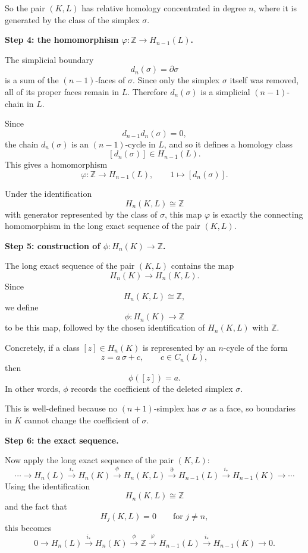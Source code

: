 \begin{solution}
So the pair \((K,L)\) has relative homology concentrated in degree \(n\), where it is generated by the class of the simplex \(\sigma\).

\par

\textbf{Step 4: the homomorphism \(\varphi:\mathbb Z\to H_{n-1}(L)\).}

The simplicial boundary
\[
d_n(\sigma)=\partial \sigma
\]
is a sum of the \((n-1)\)-faces of \(\sigma\). Since only the simplex \(\sigma\) itself was removed, all of its proper faces remain in \(L\). Therefore \(d_n(\sigma)\) is a simplicial \((n-1)\)-chain in \(L\).

Since
\[
d_{n-1}d_n(\sigma)=0,
\]
the chain \(d_n(\sigma)\) is an \((n-1)\)-cycle in \(L\), and so it defines a homology class
\[
[d_n(\sigma)]\in H_{n-1}(L).
\]
This gives a homomorphism
\[
\varphi:\mathbb Z\to H_{n-1}(L),
\qquad
1\mapsto [d_n(\sigma)].
\]

Under the identification
\[
H_n(K,L)\cong \mathbb Z
\]
with generator represented by the class of \(\sigma\), this map \(\varphi\) is exactly the connecting homomorphism in the long exact sequence of the pair \((K,L)\).

\par

\textbf{Step 5: construction of \(\phi:H_n(K)\to \mathbb Z\).}

The long exact sequence of the pair \((K,L)\) contains the map
\[
H_n(K)\to H_n(K,L).
\]
Since
\[
H_n(K,L)\cong \mathbb Z,
\]
we define
\[
\phi:H_n(K)\to \mathbb Z
\]
to be this map, followed by the chosen identification of \(H_n(K,L)\) with \(\mathbb Z\).

Concretely, if a class \([z]\in H_n(K)\) is represented by an \(n\)-cycle of the form
\[
z = a\,\sigma + c,
\qquad c\in C_n(L),
\]
then
\[
\phi([z])=a.
\]
In other words, \(\phi\) records the coefficient of the deleted simplex \(\sigma\).

This is well-defined because no \((n+1)\)-simplex has \(\sigma\) as a face, so boundaries in \(K\) cannot change the coefficient of \(\sigma\).

\par

\textbf{Step 6: the exact sequence.}

Now apply the long exact sequence of the pair \((K,L)\):
\[
\cdots \to H_n(L)\xrightarrow{i_*} H_n(K)\xrightarrow{\phi} H_n(K,L)
\xrightarrow{\partial} H_{n-1}(L)\xrightarrow{i_*} H_{n-1}(K)\to \cdots
\]
Using the identification
\[
H_n(K,L)\cong \mathbb Z
\]
and the fact that
\[
H_j(K,L)=0\qquad\text{for } j\neq n,
\]
this becomes
\[
0\longrightarrow H_n(L)\xrightarrow{i_*} H_n(K)\xrightarrow{\phi} \mathbb Z
\xrightarrow{\varphi} H_{n-1}(L)\xrightarrow{i_*} H_{n-1}(K)\longrightarrow 0.
\]


\end{solution}
